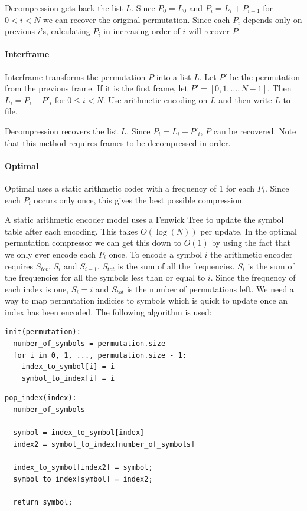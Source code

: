 \documentclass[a4paper]{report}
\begin{document}
Decompression gets back the list $L$. Since $P_0 = L_0$ and $P_i = L_i +
P_{i-1}$ for $0 < i < N$ we can recover the original permutation. Since each
$P_i$ depends only on previous $i$'s, calculating $P_i$ in increasing order of
$i$ will recover $P$.

\paragraph{Interframe}
Interframe transforms the permutation $P$ into a list $L$. Let $P'$ be the
permutation from the previous frame. If it is the first frame, let $P' =
[0,1,\dots,N-1]$. Then $L_i = P_i - P'_i$ for $0 \le i < N$. Use arithmetic
encoding on $L$ and then write $L$ to file.

Decompression recovers the list $L$. Since $P_i = L_i + P'_i$, $P$ can be
recovered. Note that this method requires frames to be decompressed in order.

\paragraph{Optimal}
Optimal uses a static arithmetic coder with a frequency of $1$ for each
$P_i$. Since each $P_i$ occurs only once, this gives the best possible
compression.

A static arithmetic encoder model uses a Fenwick Tree to update the symbol
table after each encoding. This takes $O(\log(N))$ per update. In the optimal
permutation compressor we can get this down to $O(1)$ by using the fact that
we only ever encode each $P_i$ once. To encode a symbol $i$ the arithmetic
encoder requires $S_{tot}$, $S_i$ and $S_{i-1}$. $S_{tot}$ is the sum of all
the frequencies. $S_i$ is the sum of the frequencies for all the symbols less
than or equal to $i$. Since the frequency of each index is one, $S_i = i$ and
$S_{tot}$ is the number of permutations left. We need a way to map permutation
indicies to symbols which is quick to update once an index has been
encoded. The following algorithm is used:

\begin{verbatim}
init(permutation):
  number_of_symbols = permutation.size
  for i in 0, 1, ..., permutation.size - 1:
    index_to_symbol[i] = i
    symbol_to_index[i] = i
\end{verbatim}

\begin{verbatim}
pop_index(index):
  number_of_symbols--

  symbol = index_to_symbol[index]
  index2 = symbol_to_index[number_of_symbols]

  index_to_symbol[index2] = symbol;
  symbol_to_index[symbol] = index2;

  return symbol;
\end{verbatim}
\end{document}
